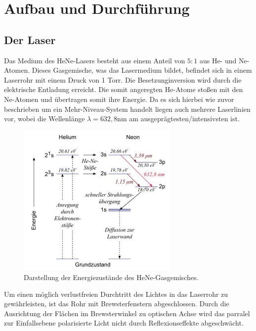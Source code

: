 \newpage
\section{Aufbau und Durchführung}
\subsection{Der Laser}
Das Medium des HeNe-Lasers besteht aus einem Anteil von $5:1$ aus He- und Ne-Atomen.
Dieses Gasgemische, was das Lasermedium bildet, befindet sich in einem Laserrohr mit einem Druck von 1 Torr. Die Besetzunginversion wird durch die
elektrische Entladung erreicht. Die somit angeregten He-Atome stoßen mit den Ne-Atomen und übertragen somit ihre Energie.
Da es sich hierbei wie zuvor beschrieben um ein Mehr-Niveau-System handelt liegen auch mehrere Laserlinien vor, wobei die Wellenlänge
$\lambda=632,8$nm am ausgeprägtesten/intensivsten ist.\\
\begin{figure}[H]
    \center
    \includegraphics[width=0.7\textwidth]{bilder/lasermedium.jpg}
    \caption{Darstellung der Energiezustände des HeNe-Gasgemisches.}
\end{figure}

Um einen möglich verlustfreien Durchtritt des Lichtes in das Laserrohr zu gewährleisten, ist das Rohr mit Brewsterfenstern abgeschlossen.
Durch die Ausrichtung der Flächen im Brewsterwinkel zu optischen Achse wird das parralel zur Einfallsebene polarisierte Licht nicht durch Reflexionseffekte abgeschwächt.

